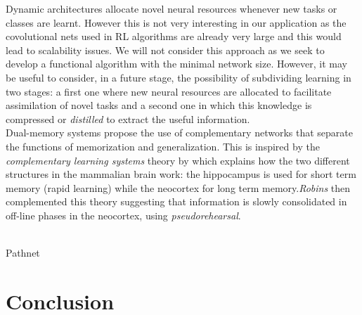 \documentclass{article}
\begin{document}
\newline
Dynamic architectures allocate novel neural resources whenever  new tasks or classes are learnt. However this is not very interesting in our application as the covolutional nets used in RL algorithms are already very large and this would lead to scalability issues. We will not consider this approach as we seek to develop a functional algorithm with the minimal network size. However, it may be useful to consider, in a future stage, the possibility of subdividing learning in two stages: a first one where new neural resources are allocated to facilitate assimilation of novel tasks and a second one in which this knowledge is compressed or \textit{distilled} to extract the useful information.\\
\newline
Dual-memory systems propose the use of complementary networks that separate the functions of memorization and generalization. This is inspired by the \textit{complementary learning systems} theory by \citep{McClelland1995WhyMemory.} which explains how the two different structures in the mammalian brain work: the hippocampus is used for short term memory (rapid learning) while the neocortex for long term memory.\textit{Robins} then complemented this theory suggesting that information is slowly consolidated in off-line phases in the neocortex, using \textit{pseudorehearsal}.

















 \\

Pathnet\\




\section{Conclusion}















\newpage
\end{document}
